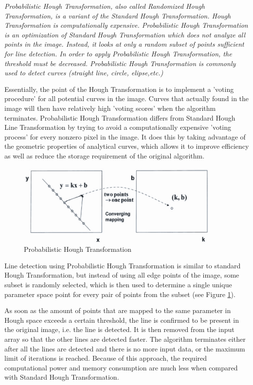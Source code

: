 \emph{\color{green}Probabilistic Hough Transformation, also called Randomized Hough Transformation, is a variant of the Standard Hough Transformation. Hough Transformation is computationally expensive. Probabilistic Hough Transformation is an optimization of Standard Hough Transformation which does not analyze all points in the image. Instead, it looks at only a random subset of points sufficient for line detection. In order to apply Probabilistic Hough Transformation, the threshold must be decreased. Probabilistic Hough Transformation is commonly used to detect curves (straight line, circle, elipse,etc.) }




Essentially, the point of the Hough Transformation is to implement a 'voting procedure' for all potential curves in the image. Curves that actually found in the image will then have relatively high 'voting scores' when the algorithm terminates. Probabilistic Hough Transformation differs from Standard Hough Line Transformation by trying to avoid a computationally expensive 'voting process' for every nonzero pixel in the image. It does this by taking advantage of the geometric properties of analytical curves, which allows it to improve efficiency as well as reduce the storage requirement of the original algorithm.


 \begin{figure}[H]
 \centering
  \includegraphics[width=0.9\textwidth]{./Bilder/Probabilistic_HT.png}
  \caption{Probabilistic Hough Transformation}
  \label{Probabilistic_HT_fig}
\end{figure}

Line detection using Probabilistic Hough Transformation is similar to standard Hough Transformation, but instead of using all edge points of the image, some subset is randomly selected, which is then used to determine a single unique parameter space point for every pair of points from the subset (see Figure \ref{Probabilistic_HT_fig}).

As soon as the amount of points that are mapped to the same parameter in Hough space exceeds a certain threshold, the line is confirmed to be present in the original image, i.e. the line is detected. It is then removed from the input array so that the other lines are detected faster. The algorithm terminates either after all the lines are detected and there is no more input data, or the maximum limit of iterations is reached. Because of this approach, the required computational power and memory consumption are much less when compared with Standard Hough Transformation.


